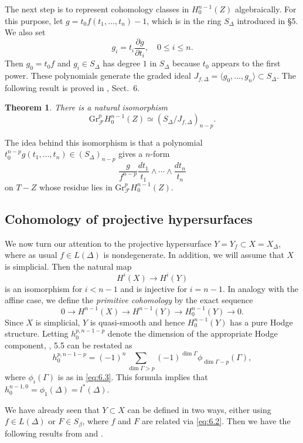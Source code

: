 \documentclass{amsart}
\theoremstyle{plain}
\newtheorem{theorem}{Theorem}[section]
\theoremstyle{definition}
\begin{document}
	The next step is to represent cohomology classes in
$H^{n-1}_0(Z)$ algebraically.  For this purpose, let $g = t_0
f(t_1,\dots,t_n) - 1$, which is in the ring $S_\Delta$ introduced in
\S5.  We also set
\[
g_i = t_i \frac{\partial g}{\partial t_i},\quad 0 \le i \le n.
\]
Then $g_0 = t_0 f$ and $g_i \in S_\Delta$ has degree $1$ in $S_\Delta$
because $t_0$ appears to the first power.  These polynomials generate
the graded ideal $J_{f,\Delta} = \langle g_0,\dots,g_n\rangle \subset
S_\Delta$.
The following result is proved in \cite{Bat4}, Sect.~6.

\begin{theorem} There is a natural isomorphism
\[
\mathrm{Gr}_{\mathcal{F}}^p H_0^{n-1}(Z) \simeq
(S_\Delta/J_{f,\Delta})_{n-p}.
\]
\end{theorem}

	The idea behind this isomorphism is that a polynomial
$t_0^{n-p}g(t_1,\dots,t_n) \in (S_\Delta)_{n-p}$ gives a $n$-form
\[
\frac{g}{f^{n-p}} \frac{dt_1}{t_1}\wedge\cdots\wedge \frac{dt_n}{t_n}
\]
on $T-Z$ whose residue lies in $\mathrm{Gr}_{\mathcal{F}}^p H_0^{n-1}(Z)$.

	\subsection{Cohomology of projective hypersurfaces}
We now turn our attention to the projective hypersurface $Y = Y_f
\subset X = X_\Delta$, where as usual $f \in L(\Delta)$ is
nondegenerate.  In addition, we will assume that $X$ is simplicial.
Then the natural map
\[
H^i(X) \longrightarrow H^i(Y)
\]
is an isomorphism for $i < n-1$ and is injective for $i = n-1$.  In
analogy with the affine case, we define the {\it primitive
cohomology\/} by the exact sequence
\[
0 \longrightarrow H^{n-1}(X) \longrightarrow H^{n-1}(Y)
\longrightarrow H_0^{n-1}(Y) \longrightarrow 0.
\]
Since $X$ is simplicial, $Y$ is quasi-smooth and hence $H_0^{n-1}(Y)$
has a pure Hodge structure.  Letting $h_0^{p,n-1-p}$ denote the
dimension of the appropriate Hodge component, \cite{DK}, 5.5 can
be restated as
\[
h_0^{p,n-1-p} = (-1)^{n} \sum_{\dim\Gamma > p} (-1)^{\dim \Gamma}
\phi_{\dim \Gamma - p}(\Gamma),
\]
where $\phi_i(\Gamma)$ is as in \eqref{eq:6.3}.  This formula implies
that $h_0^{n-1,0} = \phi_1(\Delta) = l^*(\Delta)$.

	We have already seen that $Y \subset X$ can be defined
in two ways, either using $f \in L(\Delta)$ or $F \in S_\beta$, where
$f$ and $F$ are related via \eqref{eq:6.2}.  Then we have the following
results from \cite{Bat4} and \cite{BC}.
\end{document}
